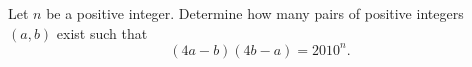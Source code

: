 Let $n$ be a positive integer. Determine how many pairs of positive integers $(a,b)$ exist such that
$$(4a-b)(4b-a)=2010^n.$$
